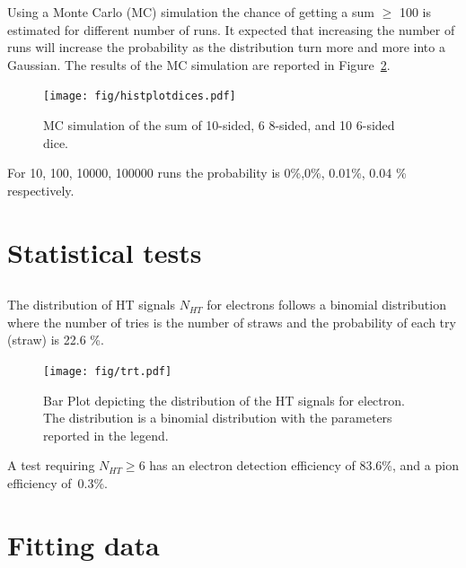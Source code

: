 \documentclass[twocolumn]{article}
\begin{document}
	    Using a Monte Carlo (MC) simulation the chance of getting a sum $\ge$ 100 is estimated for different number of runs. It expected that increasing  the
	    number of runs will increase the probability as the distribution turn more and more into a Gaussian.
	    The results of the MC simulation are reported in Figure~\ref{fig:figure1}.
	    \begin{figure}[h]
	    	\begin{center}
	    		\texttt{[image: fig/histplotdices.pdf]}
	    	\end{center}
	    	\caption{MC simulation of the sum of  10-sided, 6 8-sided, and 10 6-sided dice.}
	    	\label{fig:figure1}
	    \end{figure}

	    For 10, 100, 10000, 100000 runs the probability is 0\%,0\%, 0.01\%, 0.04 \% respectively.

\section{Statistical tests} %
\label{sec:statistical_tests}
	\subsection{}
		The distribution of HT signals $N_{HT}$ for electrons follows a binomial distribution where the number of tries is the number of straws and the probability of each try (straw) is 22.6 \%.
		\begin{figure}[h]
			\begin{center}
				\texttt{[image: fig/trt.pdf]}
			\end{center}
			\caption{Bar Plot depicting the distribution of the HT signals for electron. The distribution is a binomial distribution with the parameters reported in the legend.}
			\label{fig:figure1}
		\end{figure}
		
		A test requiring $N_{HT} \ge 6$ has an electron detection efficiency of 83.6\%, and a pion efficiency of~0.3\%.


\section{Fitting data} %
\label{sec:fitting_data}
\end{document}
